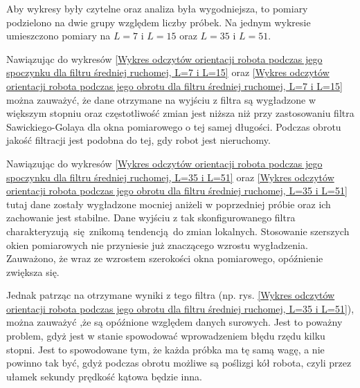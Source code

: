 {{{            Aby wykresy były czytelne oraz analiza była wygodniejsza, to pomiary podzielono na dwie grupy względem liczby próbek. Na jednym wykresie umieszczono pomiary na $L=7$ i $L=15$ oraz $L=35$ i $L=51$.
            
            

            \newpage
            Nawiązując do wykresów \ref{Wykres odczytów orientacji robota podczas jego spoczynku dla filtru średniej ruchomej, L=7 i L=15} oraz \ref{Wykres odczytów orientacji robota podczas jego obrotu dla filtru średniej ruchomej, L=7 i L=15} można zauważyć, że dane otrzymane na wyjściu z filtra są wygładzone w większym stopniu oraz częstotliwość zmian jest niższa niż przy zastosowaniu filtra Sawickiego-Golaya dla okna pomiarowego o tej samej długości. 
            Podczas obrotu jakość filtracji jest podobna do tej, gdy robot jest nieruchomy. 
            
            

            \newpage

            Nawiązując do wykresów \ref{Wykres odczytów orientacji robota podczas jego spoczynku dla filtru średniej ruchomej, L=35 i L=51} oraz \ref{Wykres odczytów orientacji robota podczas jego obrotu dla filtru średniej ruchomej, L=35 i L=51} tutaj dane zostały wygładzone mocniej aniżeli w poprzedniej próbie oraz ich zachowanie jest stabilne. Dane wyjściu z tak skonfigurowanego filtra charakteryzują się znikomą tendencją do zmian lokalnych. Stosowanie szerszych okien pomiarowych nie przyniesie już znaczącego wzrostu wygładzenia. Zauważono, że wraz ze wzrostem szerokości okna pomiarowego, opóźnienie zwiększa się.
            
            Jednak patrząc na otrzymane wyniki z tego filtra (np. rys. \ref{Wykres odczytów orientacji robota podczas jego obrotu dla filtru średniej ruchomej,
            L=35 i L=51}), można zauważyć ,że  są opóźnione względem danych surowych. Jest to poważny problem, gdyż jest w stanie spowodować wprowadzeniem błędu rzędu kilku stopni. Jest to spowodowane tym, że każda próbka ma tę samą wagę, a nie powinno tak być, gdyż podczas obrotu możliwe są poślizgi kół robota, czyli przez ułamek sekundy prędkość kątowa będzie inna.

}}}
